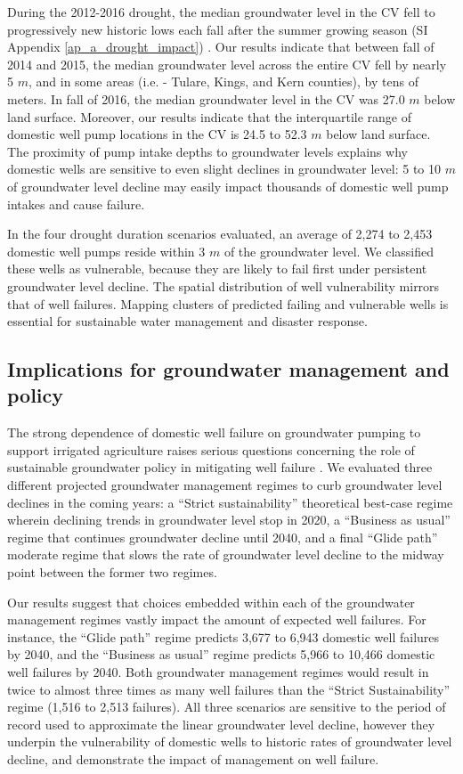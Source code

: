 During the 2012-2016 drought, the median groundwater level in the CV fell to progressively new historic lows each fall after the summer growing season (SI Appendix \ref{ap_a_drought_impact}) \citep{dwrgwl2017}. Our results indicate that between fall of 2014 and 2015, the median groundwater level across the entire CV fell by nearly 5 $m$, and in some areas (i.e. - Tulare, Kings, and Kern counties), by tens of meters. In fall of 2016, the median groundwater level in the CV was 27.0 $m$ below land surface. Moreover, our results indicate that the interquartile range of domestic well pump locations in the CV is 24.5 to 52.3 $m$ below land surface. The proximity of pump intake depths to groundwater levels explains why domestic wells are sensitive to even slight declines in groundwater level: 5 to 10 $m$ of groundwater level decline may easily impact thousands of domestic well pump intakes and cause failure. 

In the four drought duration scenarios evaluated, an average of 2,274 to 2,453 domestic well pumps reside within 3 $m$ of the groundwater level. We classified these wells as vulnerable, because they are likely to fail first under persistent groundwater level decline. The spatial distribution of well vulnerability mirrors that of well failures. Mapping clusters of predicted failing and vulnerable wells is essential for sustainable water management and disaster response.


\subsection{Implications for groundwater management and policy}

The strong dependence of domestic well failure on groundwater pumping to support irrigated agriculture raises serious questions concerning the role of sustainable groundwater policy in mitigating well failure \citep{Hanak2019}. We evaluated three different projected groundwater management regimes to curb groundwater level declines in the coming years: a ``Strict sustainability'' theoretical best-case regime wherein declining trends in groundwater level stop in 2020, a ``Business as usual'' regime that continues groundwater decline until 2040, and a final ``Glide path'' moderate regime that slows the rate of groundwater level decline to the midway point between the former two regimes.  

Our results suggest that choices embedded within each of the groundwater management regimes vastly impact the amount of expected well failures. For instance, the ``Glide path'' regime predicts 3,677 to 6,943 domestic well failures by 2040, and the ``Business as usual'' regime predicts 5,966 to 10,466 domestic well failures by 2040. Both groundwater management regimes would result in twice to almost three times as many well failures than the ``Strict Sustainability'' regime (1,516 to 2,513 failures). All three scenarios are sensitive to the period of record used to approximate the linear groundwater level decline, however they underpin the vulnerability of domestic wells to historic rates of groundwater level decline, and demonstrate the impact of management on well failure.  

